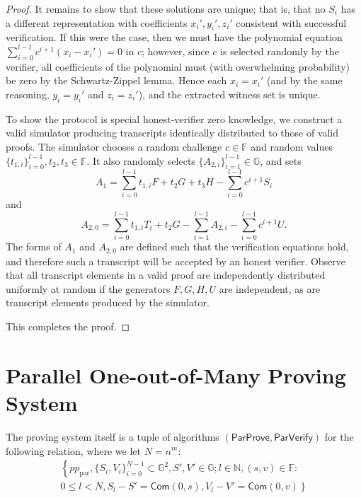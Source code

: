 \documentclass{llncs}
\newcommand{\G}{\mathbb{G}}
\newcommand{\F}{\mathbb{F}}
\newcommand{\func}[1]{\mathsf{#1}}
\newcommand{\com}{\func{Com}}
\begin{document}
\begin{proof}
It remains to show that these solutions are unique; that is, that no $S_i$ has a different representation with coefficients $x_i',y_i',z_i'$ consistent with successful verification.
If this were the case, then we must have the polynomial equation $\sum_{i=0}^{l-1} c^{i+1}(x_i - x_i') = 0$ in $c$; however, since $c$ is selected randomly by the verifier, all coefficients of the polynomial must (with overwhelming probability) be zero by the Schwartz-Zippel lemma.
Hence each $x_i = x_i'$ (and by the same reasoning, $y_i = y_i'$ and $z_i = z_i'$), and the extracted witness set is unique.

To show the protocol is special honest-verifier zero knowledge, we construct a valid simulator producing transcripts identically distributed to those of valid proofs.
The simulator chooses a random challenge $c \in \F$ and random values $\{t_{1,i}\}_{i=0}^{l-1}, t_2, t_3 \in \F$.
It also randomly selects $\{A_{2,i}\}_{i=1}^{l-1} \in \G$, and sets $$A_1 = \sum_{i=0}^{l-1} t_{1,i} F + t_2 G + t_3 H - \sum_{i=0}^{l-1} c^{i+1} S_i$$ and $$A_{2,0} = \sum_{i=0}^{l-1} t_{1,i} T_i + t_2 G - \sum_{i=1}^{l-1} A_{2,i} -  \sum_{i=0}^{l-1} c^{i+1} U.$$
The forms of $A_1$ and $A_{2,0}$ are defined such that the verification equations hold, and therefore such a transcript will be accepted by an honest verifier.
Observe that all transcript elements in a valid proof are independently distributed uniformly at random if the generators $F,G,H,U$ are independent, as are transcript elements produced by the simulator.

This completes the proof.
\end{proof}


\section{Parallel One-out-of-Many Proving System}
\label{app:parallel}

The proving system itself is a tuple of algorithms $(\func{ParProve},\func{ParVerify})$ for the following relation, where we let $N = n^m$:
\begin{multline*}
\left\{ pp_{\text{par}}, \{S_i,V_i\}_{i=0}^{N-1} \subset \G^2, S',V' \in \G ; l \in \mathbb{N}, (s,v) \in \F : \right. \\
\left. 0 \leq l < N, S_l - S' = \com(0,s), V_l - V' = \com(0,v) \right\}
\end{multline*}
\end{document}
